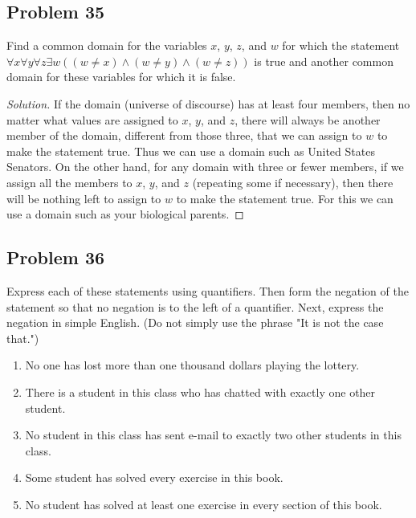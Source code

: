 \documentclass{article}
\newenvironment{solution}{\renewcommand\qedsymbol{}\begin{proof}[Solution]}{\end{proof}}
\begin{document}
\subsection*{Problem 35}
Find a common domain for the variables $x$, $y$, $z$, and $w$ for which the statement $\forall x \forall y \forall z \exists w((w \neq x) \land (w \neq y) \land (w \neq z))$ is true and another common domain for these variables for which it is false.

\begin{solution}
If the domain (universe of discourse) has at least four members, then no matter what values are assigned to $x$, $y$, and $z$, there will always be another member of the domain, different from those three, that we can assign to $w$ to make the statement true. Thus we can use a domain such as United States Senators. On the other hand, for any domain with three or fewer members, if we assign all the members to $x$, $y$, and $z$ (repeating some if necessary), then there will be nothing left to assign to $w$ to make the statement true. For this we can use a domain such as your biological parents.
\end{solution}

\clearpage
\subsection*{Problem 36}
Express each of these statements using quantifiers. Then form the negation of the statement so that no negation is to the left of a quantifier. Next, express the negation in simple English. (Do not simply use the phrase "It is not the case that.")

\begin{enumerate}[leftmargin=16pt, topsep = 8pt]
\item No one has lost more than one thousand dollars playing the lottery.
\item There is a student in this class who has chatted with exactly one other student.
\item No student in this class has sent e-mail to exactly two other students in this class.
\item Some student has solved every exercise in this book.
\item No student has solved at least one exercise in every section of this book.
\end{enumerate}
\end{document}

